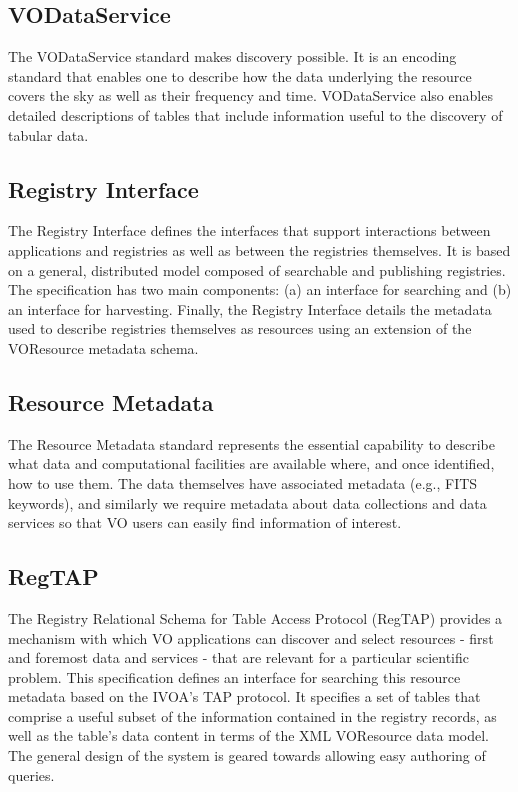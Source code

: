 \documentclass[11pt,letter]{ivoa}
\begin{document}
\subsection{VODataService}

The VODataService \citep{2021ivoa.spec.1102D} standard makes discovery
possible. It is an encoding standard that enables one to
describe how the data underlying the resource covers the sky as well as
their frequency and time.
VODataService also enables detailed descriptions of tables that include
information useful to the
discovery of tabular data. 

\subsection{Registry Interface}

The Registry Interface \citep{2018ivoa.spec.0723D} defines the
interfaces that support interactions between applications and
registries as well as between the registries themselves. It is based on
a general, distributed
model composed of searchable and publishing registries. The
specification has two main components:
(a) an interface for searching and (b) an interface for harvesting.
Finally, the Registry Interface
details the metadata used to describe registries themselves as resources
using an extension of the
VOResource metadata schema.

\subsection{Resource Metadata}

The Resource Metadata \citep{2007ivoa.spec.0302H} standard represents
the essential capability to describe what data and
computational facilities are available where, and once identified, how
to use them. The data
themselves have associated metadata (e.g., FITS keywords), and similarly
we require metadata
about data collections and data services so that VO users can easily
find information of interest.

\subsection{RegTAP}

The Registry Relational Schema for Table Access Protocol (RegTAP)
\citep{2019ivoa.spec.1011D} provides a mechanism
with which VO applications can discover and select resources - first and
foremost data and services
- that are relevant for a particular scientific problem. This
specification defines an interface
for searching this resource metadata based on the IVOA's TAP protocol.
It specifies a set of tables
that comprise a useful subset of the information contained in the
registry records, as well as the
table's data content in terms of the XML VOResource data model. The
general design of the system
is geared towards allowing easy authoring of queries. 
\end{document}
